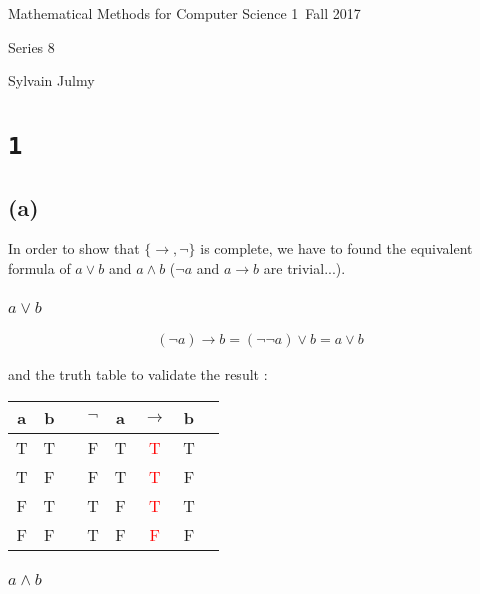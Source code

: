 \documentclass[a4paper,11pt]{report}
\author{Sylvain Julmy}
\date{\today}
\begin{document}
\begin{center}
  \Large{
    Mathematical Methods for Computer Science 1\
    Fall 2017
  }
  \noindent\makebox[\linewidth]{\rule{\linewidth}{0.4pt}}

  Series 8
  \vspace*{1.4cm}

  Sylvain Julmy
  
  \noindent\makebox[\linewidth]{\rule{\linewidth}{0.4pt}}
\end{center}

\section*{\texttt{1}}

\subsection*{(a)}

In order to show that $\{\rightarrow,\neg\}$ is complete, we have to found the
equivalent formula of $a \vee b$ and $a \wedge b$ ($\neg a$ and $a \rightarrow b$
are trivial...).

\subsubsection*{$a \vee b$}

\begin{gather*}
  (\neg a) \rightarrow b = (\neg \neg a) \vee b = a \vee b
\end{gather*}

and the truth table to validate the result :

\begin{center}
  \begin{tabular}{@{ }c@{ }@{ }c | c@{ }@{ }c@{ }@{ }c@{ }@{ }c@{ }@{ }c@{ }@{ }c}
    a & b &  & $\neg$ & a & $\rightarrow$ & b & \\
    \hline 
    T & T &  & F & T & \textcolor{red}{T} & T & \\
    T & F &  & F & T & \textcolor{red}{T} & F & \\
    F & T &  & T & F & \textcolor{red}{T} & T & \\
    F & F &  & T & F & \textcolor{red}{F} & F & \\
  \end{tabular}
\end{center}

\subsubsection*{$a \wedge b$}
\end{document}
